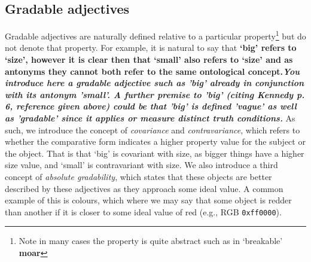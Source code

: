 \documentclass[11pt]{article}
\begin{document}
\subsection{Gradable adjectives}

Gradable adjectives are naturally defined relative to a particular 
property\footnote{Note in many cases the property is quite abstract such as in 
`breakable' \textbf{moar}} but do not denote that property. For example, it is natural to say that \textbf{`big' refers to 
`size', however it is clear then that `small' also refers to `size' and as antonyms 
they cannot both refer to the same ontological concept.\textit{You introduce here a gradable adjective such as 'big' already in conjunction with its antonym 'small'. A further premise to 'big' (citing Kennedy p. 6, reference given above) could be that 'big' is defined 'vague' as well as 'gradable' since it applies or measure distinct truth conditions. }} As such, we introduce 
the concept of \emph{covariance} and \emph{contravariance}, which refers to 
whether the comparative form indicates a higher property value for the subject 
or the object. That is that `big' is covariant with size, as bigger things have 
a higher size value, and `small' is contravariant with size. We also introduce 
a third concept of \emph{absolute gradability}, which states that these objects 
are better described by these adjectives as they approach some ideal value. 
A common example of this is colours, which where we may say that some object is 
redder than another if it is closer to some ideal value of red 
(e.g., RGB {\tt 0xff0000}). 
\end{document}
